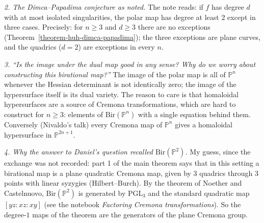 \medskip\noindent
{\it 2. The Dimca--Papadima conjecture as
noted.} The note reads: if $f$ has degree $d$
with at most isolated singularities, the
polar map has degree at least $2$ except in
three cases. Precisely: for $n \ge 3$ and
$d \ge 3$ there are no exceptions
(Theorem~\ref{theorem-huh-dimca-papadima});
the three exceptions are plane curves, and
the quadrics ($d = 2$) are exceptions in
every $n$.

\medskip\noindent
{\it 3. ``Is the image under the dual map
good in any sense? Why do we worry about
constructing this birational map?''} The
image of the polar map is all of
$\mathbb{P}^n$ whenever the Hessian
determinant is not identically zero; the
image of the hypersurface itself is its dual
variety. The reason to care is that
homaloidal hypersurfaces are a source of
Cremona transformations, which are hard to
construct for $n \ge 3$: elements of
$\mathrm{Bir}(\mathbb{P}^n)$ with a single
equation behind them. Conversely (Nivaldo's
talk) every Cremona map of $\mathbb{P}^n$
gives a homaloidal hypersurface in
$\mathbb{P}^{2n+1}$.

\medskip\noindent
{\it 4. Why the answer to Daniel's question
recalled $\mathrm{Bir}(\mathbb{P}^2)$.} My
guess, since the exchange was not recorded:
part 1 of the main theorem says that in this
setting a birational map is a plane quadratic
Cremona map, given by $3$ quadrics through
$3$ points with linear syzygies
(Hilbert--Burch).
By the theorem of Noether and Castelnuovo,
$\mathrm{Bir}(\mathbb{P}^2)$ is generated by
$\mathrm{PGL}_3$ and the standard quadratic
map $[yz : xz : xy]$ (see the notebook
\emph{Factoring Cremona transformations}).
So the degree-$1$ maps of the theorem are
the generators of the plane Cremona group.

